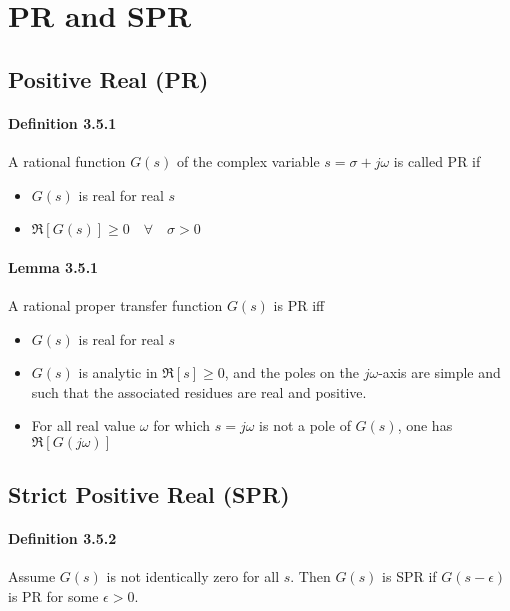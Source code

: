 \section{PR and SPR}

\subsection{Positive Real (PR)}
\paragraph{Definition 3.5.1}
A rational function $G(s)$ of the complex variable $s=\sigma + j\omega$ is called PR if
\begin{itemize}
	\item $G(s)$ is real for real $s$
	\item $\Re[G(s)] \geq 0 \quad \forall \quad \sigma > 0$
\end{itemize}

\paragraph{Lemma 3.5.1}
A rational proper transfer function $G(s)$ is PR iff
\begin{itemize}
	\item $G(s)$ is real for real $s$
	\item $G(s)$ is analytic in $\Re[s] \geq 0$, and the poles on the $j\omega$-axis are simple and such that the associated residues are real and positive.
	\item For all real value $\omega$ for which $s = j \omega$ is not a pole of $G(s)$, one has $\Re[G(j\omega)]$
\end{itemize}

\subsection{Strict Positive Real (SPR)}
\paragraph{Definition 3.5.2}
Assume $G(s)$ is not identically zero for all $s$. Then $G(s)$ is SPR if $G(s-\epsilon)$ is PR for some $\epsilon > 0$.

